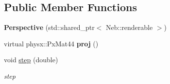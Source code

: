 \subsection*{Public Member Functions}
\begin{DoxyCompactItemize}
\item 
\hypertarget{classNeb_1_1Camera_1_1Projection_1_1Perspective_a0f893ad0e9a4dbe0b6de950b0d0233a3}{{\bfseries Perspective} (std\-::shared\-\_\-ptr$<$ Neb\-::renderable $>$)}\label{classNeb_1_1Camera_1_1Projection_1_1Perspective_a0f893ad0e9a4dbe0b6de950b0d0233a3}

\item 
\hypertarget{classNeb_1_1Camera_1_1Projection_1_1Perspective_a2fec5469b70c19093e4d2932a9ceec0a}{virtual physx\-::\-Px\-Mat44 {\bfseries proj} ()}\label{classNeb_1_1Camera_1_1Projection_1_1Perspective_a2fec5469b70c19093e4d2932a9ceec0a}

\item 
\hypertarget{classNeb_1_1Camera_1_1Projection_1_1Perspective_a74771031b253ee639dff1a15e6b9c32d}{void \hyperlink{classNeb_1_1Camera_1_1Projection_1_1Perspective_a74771031b253ee639dff1a15e6b9c32d}{step} (double)}\label{classNeb_1_1Camera_1_1Projection_1_1Perspective_a74771031b253ee639dff1a15e6b9c32d}

\begin{DoxyCompactList}\small\item\em step \end{DoxyCompactList}\end{DoxyCompactItemize}
